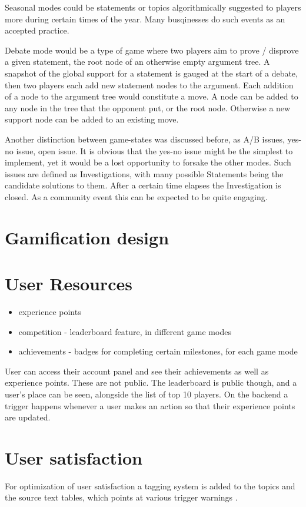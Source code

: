 \documentclass{report}
\begin{document}
Seasonal modes could be statements or topics algorithmically suggested to players more during certain times of the year. Many busqinesses do such events as an accepted practice.

Debate mode would be a type of game where two players aim to prove / disprove a given statement, the root node of an otherwise empty argument tree.  A snapshot of the global support for a statement is gauged at the start of a debate, then two players each add new statement nodes to the argument. Each addition of a node to the argument tree would constitute a move.
A node can be added to any node in the tree that the opponent put, or the root node. Otherwise a new support node can be added to an existing move.

Another distinction between game-states was discussed before, as A/B issues, yes-no issue, open issue. It is obvious that the yes-no issue might be the simplest to implement, yet it would be a lost opportunity to forsake the other modes.
Such issues are defined as Investigations, with many possible Statements being the candidate solutions to them. After a certain time elapses the Investigation is closed. As a community event this can be expected to be quite engaging.

\section{Gamification design}

\section{User Resources}
\begin{itemize}
  \item experience points 
  \item competition - leaderboard feature, in different game modes
  \item achievements - badges for completing certain milestones, for each game mode
\end{itemize}

User can access their account panel and see their achievements as well as experience points. These are not public. The leaderboard is public though, and a user's place can be seen, alongside the list of top 10 players. On the backend a trigger happens whenever a user makes an action so that their experience points are updated.
\section{User satisfaction}
For optimization of user satisfaction a tagging system is added to the topics and the source text tables, which points at various trigger warnings \cite{annemieke_small_2019}.
\newpage
\end{document}
